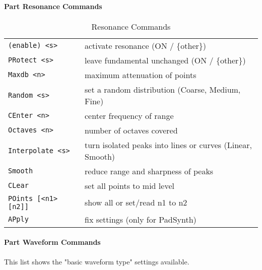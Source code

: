 \paragraph{Part Resonance Commands}
\label{paragraph:command_line_part_resonance_commands}

   \begin{table}[H]
      \centering
      \caption{Resonance Commands}
      \label{table:part_resonance_commands}
      \begin{tabular}{l l}
   \texttt{(enable) <s>} &
      activate resonance (ON / \{other\}) \\
    \texttt{PRotect <s>} &
      leave fundamental unchanged (ON / \{other\}) \\
   \texttt{Maxdb <n>} &
      maximum attenuation of points \\
   \texttt{Random <s>} &
      set a random distribution (Coarse, Medium, Fine) \\
   \texttt{CEnter <n>} &
      center frequency of range \\
   \texttt{Octaves <n>} &
      number of octaves covered \\
   \texttt{Interpolate <s>} &
      turn isolated peaks into lines or curves (Linear, Smooth) \\
   \texttt{Smooth} &
      reduce range and sharpness of peaks \\
   \texttt{CLear} &
      set all points to mid level \\
   \texttt{POints [<n1> [n2]]} &
      show all or set/read n1 to n2 \\
   \texttt{APply} &
      fix settings (only for PadSynth) \\
      \end{tabular}
   \end{table}

\paragraph{Part Waveform Commands}
\label{paragraph:command_line_part_waveform_commands}

This list shows the "basic waveform type" settings available.

